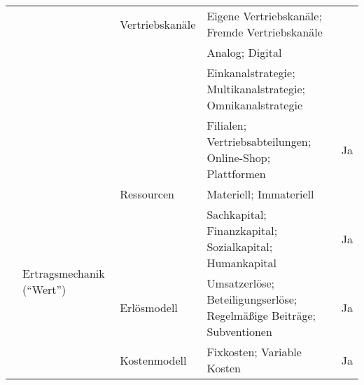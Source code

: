 \begin{sidewaystable}[htbp]
\begin{tabularx}{\textwidth}{|p{}|p{}|p{}|X|p{}|}
\cline{3-5}
 &  & Vertriebskan\"ale & Eigene Vertriebskan\"ale; Fremde Vertriebskan\"ale\\[-2pt]
 &  &  & Analog; Digital\\[-2pt]
 &  &  & Einkanalstrategie; Multikanalstrategie; Omnikanalstrategie\\[-2pt]
 &  &  & Filialen; Vertriebsabteilungen; Online-Shop; Plattformen & Ja \\
\cline{2-5}
 & \multirow{4}{*}{Ertragsmechanik (\enquote{Wert})} & Ressourcen & Materiell; Immateriell\\[-2pt]
 &  &  & Sachkapital; Finanzkapital; Sozialkapital; Humankapital & Ja \\
\cline{3-5}
 &  & Erl\"osmodell & Umsatzerl\"ose; Beteiligungserl\"ose; Regelm\"a\ss{}ige Beitr\"age; Subventionen & Ja \\
\cline{3-5}
 &  & Kostenmodell & Fixkosten; Variable Kosten & Ja \\
\hline
\end{tabularx}
\end{sidewaystable}
